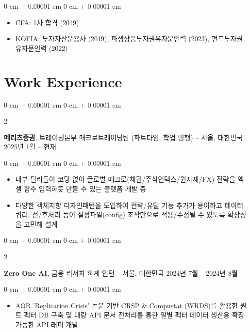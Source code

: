 \documentclass[10pt, letterpaper]{article}
\newenvironment{highlights}{
    \begin{itemize}[
        topsep=0.10 cm,
        parsep=0.10 cm,
        partopsep=0pt,
        itemsep=0pt,
        leftmargin=0 cm + 10pt
    ]
}{
    \end{itemize}
}
\newenvironment{onecolentry}{
    \begin{adjustwidth}{
        0 cm + 0.00001 cm
    }{
        0 cm + 0.00001 cm
    }
}{
    \end{adjustwidth}
}
\newenvironment{twocolentry}[2][]{
    \onecolentry
    \def\secondColumn{#2}
    \setcolumnwidth{\fill, 4.5 cm}
    \begin{paracol}{2}
}{
    \switchcolumn \raggedleft \secondColumn
    \end{paracol}
    \endonecolentry
}
\begin{document}
        \vspace{0.10 cm}
        \begin{onecolentry}
            \begin{highlights}
                \item CFA: 1차 합격 (2019)
                \item KOFIA: 투자자산운용사 (2019), 파생상품투자권유자문인력 (2023), 펀드투자권유자문인력 (2022)
            \end{highlights}
        \end{onecolentry}



    
    \section{Work Experience}

        \begin{twocolentry}{
            2025년 1월 – 현재
        }
            \textbf{메리츠증권}, 트레이딩본부 매크로트레이딩팀 (파트타임, 학업 병행) -- 서울, 대한민국\end{twocolentry}

        \vspace{0.10 cm}
        \begin{onecolentry}
            \begin{highlights}
                \item 내부 딜러들이 코딩 없이 글로벌 매크로(채권/주식인덱스/원자재/FX) 전략을 엑셀 함수 입력하듯 만들 수 있는 플랫폼 개발 중
                \item 다양한 객체지향 디자인패턴을 도입하여 전략/유틸 기능 추가가 용이하고 데이터 쿼리, 전/후처리 등이 설정파일(config) 조작만으로 적용/수정될 수 있도록 확장성을 고민해 설계
            \end{highlights}
        \end{onecolentry}


        \vspace{0.2 cm}
        
        \begin{twocolentry}{
            2024년 7월 – 2024년 8월
        }
            \textbf{Zero One AI}, 금융 리서치 하계 인턴 -- 서울, 대한민국\end{twocolentry}

        \vspace{0.10 cm}
        \begin{onecolentry}
            \begin{highlights}
                \item AQR 'Replication Crisis' 논문 기반 CRSP \& Compustat (WRDS)를 활용한 퀀트 팩터 DB 구축 및 대량 API 문서 전처리를 통한 일별 팩터 데이터 생산용 확장 가능한 API 래퍼 개발
            \end{highlights}
        \end{onecolentry}
\end{document}
